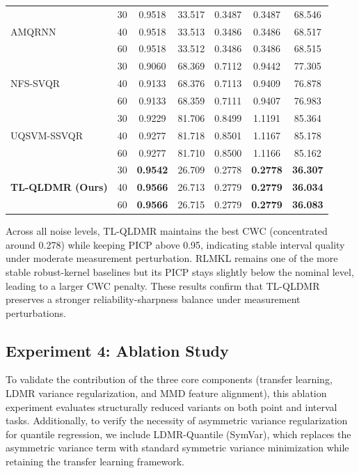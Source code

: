 \documentclass[a4paper]{cas-sc}
\begin{document}
\begin{table}[ht]
\begin{tabular}{llccccc}
\multirow{3}{*}{AMQRNN}
  & 30 & 0.9518 & 33.517 & 0.3487 & 0.3487 & 68.546 \\
  & 40 & 0.9518 & 33.513 & 0.3486 & 0.3486 & 68.517 \\
  & 60 & 0.9518 & 33.512 & 0.3486 & 0.3486 & 68.515 \\
\multirow{3}{*}{NFS-SVQR}
  & 30 & 0.9060 & 68.369 & 0.7112 & 0.9442 & 77.305 \\
  & 40 & 0.9133 & 68.376 & 0.7113 & 0.9409 & 76.878 \\
  & 60 & 0.9133 & 68.359 & 0.7111 & 0.9407 & 76.983 \\
\multirow{3}{*}{UQSVM-SSVQR}
  & 30 & 0.9229 & 81.706 & 0.8499 & 1.1191 & 85.364 \\
  & 40 & 0.9277 & 81.718 & 0.8501 & 1.1167 & 85.178 \\
  & 60 & 0.9277 & 81.710 & 0.8500 & 1.1166 & 85.162 \\
\multirow{3}{*}{\textbf{TL-QLDMR (Ours)}}
  & 30 & \textbf{0.9542} & 26.709 & 0.2778 & \textbf{0.2778} & \textbf{36.307} \\
  & 40 & \textbf{0.9566} & 26.713 & 0.2779 & \textbf{0.2779} & \textbf{36.034} \\
  & 60 & \textbf{0.9566} & 26.715 & 0.2779 & \textbf{0.2779} & \textbf{36.083} \\
\bottomrule
\end{tabular}
\label{tab:exp3_noise}
\end{table}

Across all noise levels, TL-QLDMR maintains the best CWC (concentrated around 0.278) while keeping PICP above 0.95, indicating stable interval quality under moderate measurement perturbation. RLMKL remains one of the more stable robust-kernel baselines but its PICP stays slightly below the nominal level, leading to a larger CWC penalty. These results confirm that TL-QLDMR preserves a stronger reliability-sharpness balance under measurement perturbations.


\subsection{Experiment 4: Ablation Study}\label{sec:exp4}

To validate the contribution of the three core components (transfer learning, LDMR variance regularization, and MMD feature alignment), this ablation experiment evaluates structurally reduced variants on both point and interval tasks. Additionally, to verify the necessity of asymmetric variance regularization for quantile regression, we include LDMR-Quantile (SymVar), which replaces the asymmetric variance term with standard symmetric variance minimization while retaining the transfer learning framework.
\end{document}
